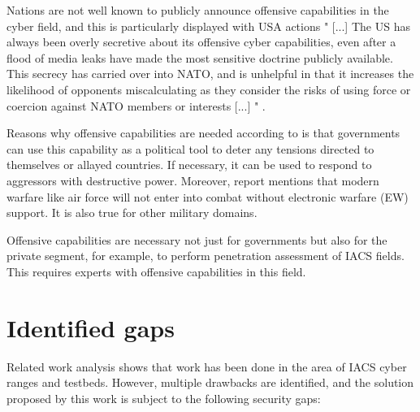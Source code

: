 Nations are not well known to publicly announce offensive capabilities in the cyber field, and this is particularly displayed with USA actions " [...] The US has always been overly secretive about its offensive cyber capabilities, even after a flood of media leaks have made the most sensitive doctrine publicly available. This secrecy has carried over into NATO, and is unhelpful in that it increases the likelihood of opponents miscalculating as they consider the risks of using force or coercion against NATO members or interests [...] " \parencite{53-NATO-role-of-offensi-cyber-capabilities}.

Reasons why offensive capabilities are needed according to \citeauthor{94-nation-offensive-capabilities-ccdco} \parencite{94-nation-offensive-capabilities-ccdco} is that governments can use this capability as a political tool to deter any tensions directed to themselves or allayed countries. If necessary, it can be used to respond to aggressors with destructive power. Moreover, report   \parencite{53-NATO-role-of-offensi-cyber-capabilities} mentions that modern warfare like air force will not enter into combat without electronic warfare (EW) support. It is also true for other military domains.

Offensive capabilities are necessary not just for governments but also for the private segment, for example, to perform penetration assessment of IACS fields. This requires experts with offensive capabilities in this field.


\section{Identified gaps} \label{sec:identified-gaps}

Related work analysis shows that work has been done in the area of IACS cyber ranges and testbeds. However, multiple drawbacks are identified, and the solution proposed by this work is subject to the following security gaps:

